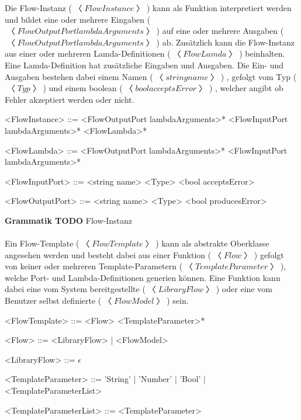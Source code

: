 \documentclass{article}
\begin{document}
    Die Flow-Instanz ($〈FlowInstance〉$) kann als Funktion interpretiert werden und bildet eine oder mehrere Eingaben ($〈FlowOutputPort lambdaArguments〉$) auf eine oder mehrere Ausgaben ($〈FlowOutputPort  lambdaArguments〉$) ab.
    Zusätzlich kann die Flow-Instanz aus einer oder mehreren Lamda-Definitionen ($〈FlowLamda〉$) beinhalten. Eine Lamda-Definition hat zusätzliche Eingaben und Ausgaben.
    Die Ein- und Ausgaben bestehen dabei einem Namen  ($〈string name〉$) , gefolgt vom Typ  ($〈Typ〉$)  und einem boolean  ($〈bool acceptsError〉$) , welcher angibt ob Fehler akzeptiert werden oder nicht.\\
    \begin{grammar}
        <FlowInstance> ::= <FlowOutputPort lambdaArguments>* <FlowInputPort lambdaArguments>* <FlowLambda>*
        
        <FlowLambda> ::= <FlowOutputPort lambdaArguments>* <FlowInputPort lambdaArguments>*

        <FlowInputPort> ::= <string name> <Type> <bool acceptsError>

        <FlowOutputPort> ::= <string name> <Type> <bool producesError>
    \end{grammar}
    \textbf{Grammatik TODO} Flow-Instanz\\\\
    Ein Flow-Template ($〈FlowTemplate〉$) kann als abstrakte Oberklasse angesehen werden und besteht dabei aus einer Funktion ($〈Flow〉$) gefolgt von keiner oder mehreren Template-Parametern ($〈TemplateParameter〉$), welche Port- und Lambda-Definitionen generien können.
    Eine Funktion kann dabei eine vom System bereitgestellte ($〈LibraryFlow〉$) oder eine vom Benutzer selbst definierte ($〈FlowModel〉$) sein.\\
    \begin{grammar}
        <FlowTemplate> ::= <Flow> <TemplateParameter>*

        <Flow> ::= <LibraryFlow> | <FlowModel>
        
        <LibraryFlow> ::= $\epsilon$

        <TemplateParameter> ::= 'String' | 'Number' | 'Bool' | <TemplateParameterList>
        
        <TemplateParameterList> ::= <TemplateParameter>
    \end{grammar}
\end{document}
